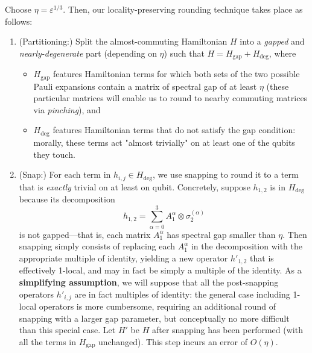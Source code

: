 \documentclass[11pt]{article}
\newcommand{\gap}{\mathrm{gap}}
\renewcommand{\deg}{\mathrm{deg}}
\theoremstyle{plain}
\newcommand{\eps}{\varepsilon}
\begin{document}
Choose $\eta =\eps^{1/3}$. Then, our locality-preserving rounding technique takes place as follows:
\begin{enumerate}
    \item (Partitioning:) Split the almost-commuting Hamiltonian $H$ into a \emph{gapped} and \emph{nearly-degenerate} part (depending on $\eta$) such that $H= H_{\gap} + H_{\deg}$, where
    \begin{itemize}
        \item $H_{\gap}$ features Hamiltonian terms for which both sets of the two possible Pauli expansions contain a matrix of spectral gap of at least $\eta$ (these particular matrices will enable us to round to nearby commuting matrices via \emph{pinching}), and

        \item $H_{\deg}$ features Hamiltonian terms that do not satisfy the gap condition: morally, these terms act "almost trivially" on at least one of the qubits they touch. 
    \end{itemize}
    \item (Snap:) For each term in $h_{i,j} \in H_{\deg}$, we use snapping to round it to a term that is \emph{exactly} trivial on at least on qubit. Concretely, suppose $h_{1,2}$ is in $H_{\deg}$ because its decomposition
    \[ h_{1,2} = \sum_{\alpha=0}^{3} A_1^\alpha \otimes \sigma_2^{(\alpha)}\]
    is not gapped---that is, each matrix $A_1^\alpha$ has spectral gap smaller than $\eta$. Then snapping simply consists of replacing each $A_1^\alpha$ in the decomposition with the appropriate multiple of identity, yielding a new operator $h'_{1,2}$ that is effectively 1-local, and may in fact be simply a multiple of the identity. As a \textbf{simplifying assumption}, we will suppose that all the post-snapping operators $h'_{i,j}$ are in fact multiples of identity: the general case including 1-local operators is more cumbersome, requiring an additional round of snapping with a larger gap parameter, but conceptually no more difficult than this special case. Let $H'$ be $H$ after snapping has been performed (with all the terms in $H_{\gap}$ unchanged). This step incurs an error of $O(\eta)$.


\end{enumerate}
\end{document}
